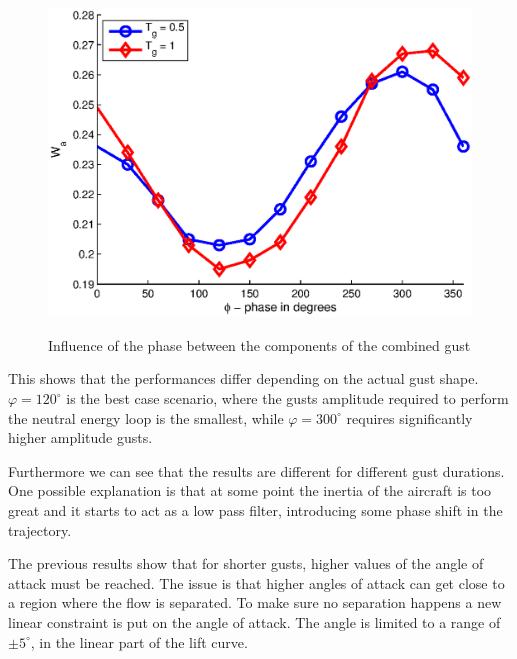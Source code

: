\begin{figure}[ht]
  \begin{center}
    \scalebox{1.0}
    {\includegraphics{./Figures/combined_gust_amplitude_vs_phase_LUT.eps}}
  \end{center}
  \caption{Influence of the phase between the components of the combined gust}
  \label{fig:combined_amplitude_phase}
\end{figure}

\par This shows that the performances differ depending on the actual gust shape.
$\varphi=120^{\circ}$ is the best case scenario, where the gusts amplitude required to perform the neutral energy loop is the smallest, while $\varphi=300^{\circ}$ requires significantly higher amplitude gusts.

\FloatBarrier

\par Furthermore we can see that the results are different for different gust durations.
One possible explanation is that at some point the inertia of the aircraft is too great and it starts to act as a low pass filter, introducing some phase shift in the trajectory. 

The previous results show that for shorter gusts, higher values of the angle of attack must be reached.
The issue is that higher angles of attack can get close to a region where the flow is separated.
To make sure no separation happens a new linear constraint is put on the angle of attack.
The angle is limited to a range of $\pm 5 ^{\circ}$, in the linear part of the lift curve.


